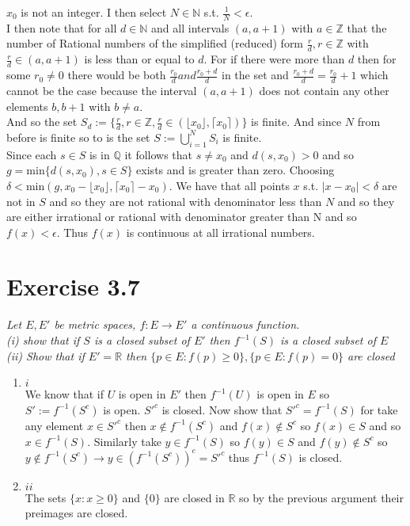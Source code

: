\documentclass{amsart}
\begin{document}
\begin{enumerate}
            $x_0$ is not an integer. I then select $N \in  \mathbb{N} $ s.t. $\frac{1}{N} < \epsilon $.\\
            I then note that for all $d \in \mathbb{N} $ and all intervals $(a,a+1)$ with $a \in \mathbb{Z} $ that the number of Rational numbers
            of the simplified (reduced) form $\frac{r}{d}, r \in \mathbb{Z} $ with $\frac{r}{d} \in (a,a+1)$ is less than or equal to $d$. For if there were more than $d$ then for some
            $r_0 \ne 0$ there would be both $\frac{r_0}{d} and \frac{ r_0+d}{d}$ in the set and $\frac{r_0+d}{d} = \frac{r_0}{d} + 1$ which cannot be the case because the interval $(a,a+1)$ does not contain any other elements $b,b+1$ with $b \ne a$.\\
            And so the set $S_d := \{\frac{r}{d}, r \in \mathbb{Z}, \frac{r}{d} \in (\lfloor x_0 \rfloor, \lceil x_0 \rceil)\}$ is finite. And since $N$ from before is finite so to is the set
            $S := \bigcup_{i=1}^N S_i$ is finite.\\
            Since each $s \in S$ is in $ \mathbb{Q}  $ it follows that $s \ne x_0$ and $d(s,x_0) > 0$ and so $ g = \text{min}\{d(s,x_0), s\in S\}$ exists and is greater than zero.
            Choosing $\delta < \text{min}(g,x_0-\lfloor x_0 \rfloor, \lceil x_0 \rceil - x_0)$. We have that all points $x$ s.t. $|x-x_0| < \delta $ are not in $S$ and so they are not rational with denominator less than $N$ and so
            they are either irrational or rational with denominator greater than N and so $f(x) < \epsilon $. Thus $f(x)$ is continuous at all irrational numbers.
    \end{enumerate}
    \section{Exercise 3.7}
    \emph{Let $E, E'$ be metric spaces, $f : E \rightarrow E'$ a continuous function.\\
    (i) show that if $S$ is a closed subset of $E'$ then $f^{-1}(S)$ is a closed subset of $E$ \\
(ii) Show that if $E' = \mathbb{R} $ then $\{p \in E: f(p) \ge 0\}, \{p\in E: f(p) = 0\}$ are closed}
    \begin{enumerate}
        \item $i$ \\
            We know that if $U$ is open in $E'$ then $f^{-1}(U)$ is open in $E$ so  $S' := f^{-1}(S^{c})$ is open. $S'^c$ is closed.
            Now show that $S'^{c} = f^{-1}(S)$ for take any element $x \in S'^{c}$ then $x \not\in f^{-1}(S^{c})$ and $f(x) \not\in S^{c}$ so $f(x) \in S$ and so  $x \in f^{-1}(S)$.
        Similarly take $y \in f^{-1}(S)$ so $f(y) \in S$ and $f(y) \not\in S^{c}$ so $y \not\in f^{-1}(S^{c}) \rightarrow y \in (f^{-1}(S^{c}))^{c} = S'^{c}$ thus $f^{-1}(S)$ is closed.
    \item $ii$ \\
        The sets $\{x : x \ge 0 \}$ and $\{0\}$ are closed in $ \mathbb{R} $ so by the previous argument their preimages are closed.
    \end{enumerate}
\end{document}
